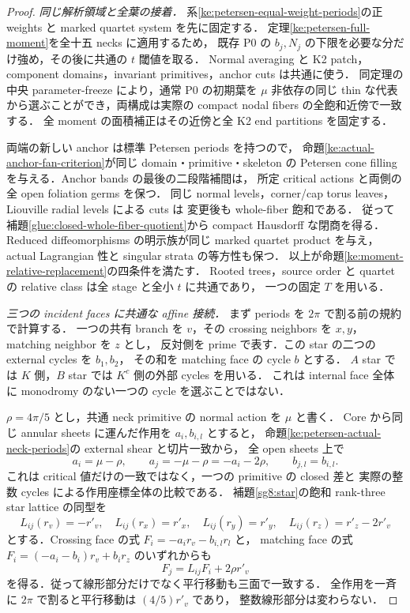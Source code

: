 \begin{proof}
\emph{同じ解析領域と全葉の接着．}
系\ref{ke:petersen-equal-weight-periods}の正 weights と marked quartet system を先に固定する．
定理\ref{ke:petersen-full-moment}を全十五 necks に適用するため，
既存 P0 の $b_j,N_j$ の下限を必要な分だけ強め，その後に共通の $t$ 閾値を取る．
Normal averaging と K2 patch，component domains，invariant primitives，anchor cuts は共通に使う．
同定理の中央 parameter-freeze により，通常 P0 の初期葉を
$\mu$ 非依存の同じ thin な代表から選ぶことができ，両構成は実際の
compact nodal fibers の全飽和近傍で一致する．
全 moment の面積補正はその近傍と全 K2 end partitions を固定する．

両端の新しい anchor は標準 Petersen periods を持つので，
命題\ref{ke:actual-anchor-fan-criterion}が同じ domain・primitive・skeleton の
Petersen cone filling を与える．Anchor bands の最後の二段階補間は，
所定 critical actions と両側の全 open foliation germs を保つ．
同じ normal levels，corner/cap torus leaves，Liouville radial levels による cuts は
変更後も whole-fiber 飽和である．
従って補題\ref{glue:closed-whole-fiber-quotient}から compact Hausdorff な閉商を得る．
Reduced diffeomorphisms の明示族が同じ marked quartet product を与え，
actual Lagrangian 性と singular strata の等方性も保つ．
以上が命題\ref{ke:moment-relative-replacement}の四条件を満たす．
Rooted trees，source order と quartet の relative class は全 stage と全小 $t$ に共通であり，
一つの固定 $T$ を用いる．

\emph{三つの incident faces に共通な affine 接続．}
まず periods を $2\pi$ で割る前の規約で計算する．
一つの共有 branch を $v$，その crossing neighbors を $x,y$，matching neighbor を $z$ とし，
反対側を prime で表す．この star の二つの external cycles を $b_1,b_2$，
その和を matching face の cycle $b$ とする．
$A$ star では $K$ 側，$B$ star では $K^c$ 側の外部 cycles を用いる．
これは internal face 全体に monodromy のない一つの cycle を選ぶことではない．

$\rho=4\pi/5$ とし，共通 neck primitive の normal action を $\mu$ と書く．
Core から同じ annular sheets に運んだ作用を $a_i,b_{i,l}$ とすると，
命題\ref{ke:petersen-actual-neck-periods}の external shear と切片一致から，
全 open sheets 上で
\[
 a_i=\mu-\rho,\qquad a_j=-\mu-\rho=-a_i-2\rho,
 \qquad b_{j,l}=b_{i,l}.
\]
これは critical 値だけの一致ではなく，一つの primitive の closed 差と
実際の整数 cycles による作用座標全体の比較である．
補題\ref{sg8:star}の飽和 rank-three star lattice の同型を
\[
 L_{ij}(r_v)=-r'_v,\quad
 L_{ij}(r_x)=r'_x,\quad L_{ij}(r_y)=r'_y,\quad
 L_{ij}(r_z)=r'_z-2r'_v
\]
とする．Crossing face の式 $F_i=-a_i r_v-b_{i,l}r_l$ と，
matching face の式 $F_i=(-a_i-b_i)r_v+b_i r_z$ のいずれからも
\begin{equation}\label{ke:eq:petersen-affine-full-transition}
 F_j=L_{ij}F_i+2\rho r'_v
\end{equation}
を得る．従って線形部分だけでなく平行移動も三面で一致する．
全作用を一斉に $2\pi$ で割ると平行移動は $(4/5)r'_v$ であり，
整数線形部分は変わらない．


\end{proof}
